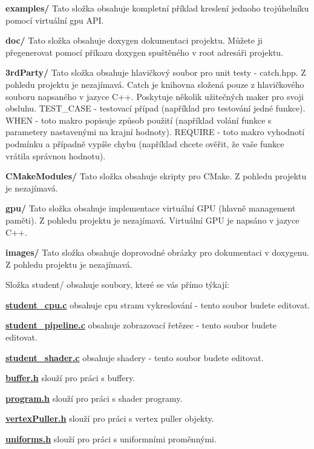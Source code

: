 {\bfseries examples/} Tato složka obsahuje kompletní příklad kreslení jednoho trojúhelníku pomocí virtuální gpu A\+PI.

{\bfseries doc/} Tato složka obsahuje doxygen dokumentaci projektu. Můžete ji přegenerovat pomocí příkazu doxygen spuštěného v root adresáři projektu.

{\bfseries 3rd\+Party/} Tato složka obsahuje hlavičkový soubor pro unit testy -\/ catch.\+hpp. Z pohledu projektu je nezajímavá. Catch je knihovna složená pouze z hlavičkového souboru napsaného v jazyce C++. Poskytuje několik užitečných maker pro svoji obsluhu. T\+E\+S\+T\+\_\+\+C\+A\+SE -\/ testovací případ (například pro testování jedné funkce). W\+H\+EN -\/ toto makro popisuje způsob použití (například volání funkce s parametery nastavenými na krajní hodnoty). R\+E\+Q\+U\+I\+RE -\/ toto makro vyhodnotí podmínku a případně vypíše chybu (například chcete ověřit, že vaše funkce vrátila správnou hodnotu).

{\bfseries C\+Make\+Modules/} Tato složka obsahuje skripty pro C\+Make. Z pohledu projektu je nezajímavá.

{\bfseries gpu/} Tato složka obsahuje implementace virtuální G\+PU (hlavně management paměti). Z pohledu projektu je nezajímavá. Virtuální G\+PU je napsáno v jazyce C++.

{\bfseries images/} Tato složka obsahuje doprovodné obrázky pro dokumentaci v doxygenu. Z pohledu projektu je nezajímavá.

Složka student/ obsahuje soubory, které se vás přímo týkají\+:

{\bfseries \hyperlink{student__cpu_8c}{student\+\_\+cpu.\+c}} obsahuje cpu stranu vykreslování -\/ tento soubor budete editovat.

{\bfseries \hyperlink{student__pipeline_8c}{student\+\_\+pipeline.\+c}} obsahuje zobrazovací řetězec -\/ tento soubor budete editovat.

{\bfseries \hyperlink{student__shader_8c}{student\+\_\+shader.\+c}} obsahuje shadery -\/ tento soubor budete editovat.

{\bfseries \hyperlink{buffer_8h}{buffer.\+h}} slouží pro práci s buffery.

{\bfseries \hyperlink{program_8h}{program.\+h}} slouží pro práci s shader programy.

{\bfseries \hyperlink{vertexPuller_8h}{vertex\+Puller.\+h}} slouží pro práci s vertex puller objekty.

{\bfseries \hyperlink{uniforms_8h}{uniforms.\+h}} slouží pro práci s uniformními proměnnými.

